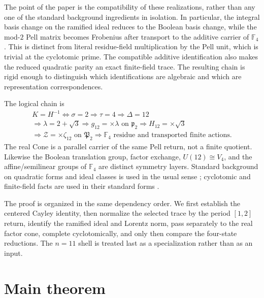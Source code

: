 \documentclass[11pt]{article}
\theoremstyle{remark}
\newcommand{\F}{\mathbb F}
\begin{document}
The point of the paper is the compatibility of these realizations, rather than
any one of the standard background ingredients in isolation.  In particular,
the integral basis change on the ramified ideal reduces to the Boolean basis
change, while the mod-$2$ Pell matrix becomes Frobenius after transport to the
additive carrier of $\F_4$.  This is distinct from literal residue-field
multiplication by the Pell unit, which is trivial at the cyclotomic prime.
The compatible additive identification also makes the reduced quadratic
parity an exact finite-field trace.  The resulting chain is rigid enough to
distinguish which identifications are algebraic and which are representation
correspondences.

The logical chain is
\[
\boxed{
\begin{gathered}
K=H^{-1}\Longleftrightarrow\sigma=2
\Longrightarrow\tau=4\Longrightarrow\Delta=12\\
\Longrightarrow\lambda=2+\sqrt3
\Longrightarrow g_{12}=\times\lambda\text{ on }\mathfrak p_2
\Longrightarrow H_{12}=\times\sqrt3\\
\Longrightarrow \mathcal Z=\times\zeta_{12}\text{ on }\mathfrak P_2
\Longrightarrow \F_4\text{ residue and transported finite actions}.
\end{gathered}}
\]
The real Cone is a parallel carrier of the same Pell return, not a finite
quotient.  Likewise the Boolean translation group, factor exchange,
$U(12)\cong V_4$, and the affine/semilinear groups of $\F_4$ are distinct
symmetry layers.  Standard background on quadratic forms and ideal classes is
used in the usual sense \cite{Cox,Neukirch}; cyclotomic and finite-field facts
are used in their standard forms \cite{Washington,LidlNiederreiter}.

The proof is organized in the same dependency order.  We first establish the
centered Cayley identity, then normalize the selected trace by the period
$[1,2]$ return, identify the ramified ideal and Lorentz norm, pass separately
to the real factor cone, complete cyclotomically, and only then compare the
four-state reductions.  The $n=11$ shell is treated last as a specialization
rather than as an input.

\section{Main theorem}
\end{document}
